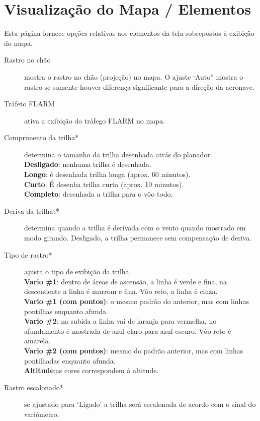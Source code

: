 \section{Visualização do Mapa / Elementos}\label{sec:map-elements}

Esta página fornece opções relativas aos elementos da tela sobrepostos à exibição do mapa.

\begin{description}
\item[Rastro no chão]  mostra o rastro no chão (projeção) no mapa.  O ajuste ‘Auto” mostra o rastro se somente houver diferença significante para a direção da aeronave.
\item[Tráfeto FLARM]  \label{conf:flarm-on-map} ativa a exibição do tráfego FLARM no mapa.
\item[Comprimento da trilha*] \label{conf:snailtrail} determina o tamanho da trilha desenhada atrás do planador. \\
  {\bf Desligado}: nenhuma trilha é desenhada. \\
  {\bf Longo}: é desenhada trilha longa (aprox. 60 minutos). \\
  {\bf Curto}: É desenha trilha curta (aprox. 10 minutos). \\
  {\bf Completo}: desenhada a trilha para o vôo todo.
\item[Deriva da trilhat*] \label{conf:traildrift} determina quando a trilha é derivada com o vento quando mostrado em modo girando.  Desligado, a trilha permanece sem compensação de deriva.
\item[Tipo de rastro*] \label{conf:snailtype} ajusta o tipo de exibição da trilha. \\
  {\bf Vario \#1}: dentro de áreas de ascensão, a linha é verde e fina, na descendente a linha é marrom e fina.  Vôo reto, a linha é cinza. \\
  {\bf Vario \#1 (com pontos)}: o mesmo padrão do anterior, mas com linhas pontilhas enquanto afunda. \\
  {\bf Vario \#2}: na subida a linha vai de laranja para vermelha, no afundamento é mostrada de azul claro para azul escuro.  Vôo reto é amarela. \\
  {\bf Vario \#2 (com pontos)}: mesmo do padrão anterior, mas com linhas pontilhadas enquanto afunda. \\
  {\bf Altitude}:as cores correspondem à altitude.
\item[Rastro escalonado*] \label{conf:trailscaled} se ajustado para ‘Ligado’ a trilha será escalonada de acordo com o sinal do variômetro.

\end{description}
